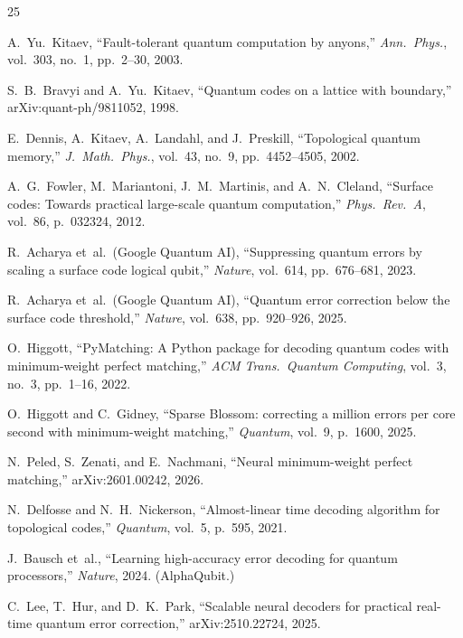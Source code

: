 \documentclass[11pt,a4paper]{article}
\begin{document}
\begin{thebibliography}{25}

A.~Yu.~Kitaev, ``Fault-tolerant quantum computation by anyons,''
\emph{Ann.\ Phys.}, vol.~303, no.~1, pp.~2--30, 2003.

S.~B.~Bravyi and A.~Yu.~Kitaev, ``Quantum codes on a lattice with
boundary,'' arXiv:quant-ph/9811052, 1998.

E.~Dennis, A.~Kitaev, A.~Landahl, and J.~Preskill, ``Topological
quantum memory,'' \emph{J.~Math.\ Phys.}, vol.~43, no.~9,
pp.~4452--4505, 2002.

A.~G.~Fowler, M.~Mariantoni, J.~M.~Martinis, and A.~N.~Cleland,
``Surface codes: Towards practical large-scale quantum computation,''
\emph{Phys.\ Rev.\ A}, vol.~86, p.~032324, 2012.

R.~Acharya et~al.\ (Google Quantum AI), ``Suppressing quantum errors by
scaling a surface code logical qubit,'' \emph{Nature}, vol.~614,
pp.~676--681, 2023.

R.~Acharya et~al.\ (Google Quantum AI), ``Quantum error correction below
the surface code threshold,'' \emph{Nature}, vol.~638, pp.~920--926,
2025.

O.~Higgott, ``PyMatching: A Python package for decoding quantum codes
with minimum-weight perfect matching,'' \emph{ACM Trans.\ Quantum
Computing}, vol.~3, no.~3, pp.~1--16, 2022.

O.~Higgott and C.~Gidney, ``Sparse Blossom: correcting a million errors
per core second with minimum-weight matching,'' \emph{Quantum}, vol.~9,
p.~1600, 2025.

N.~Peled, S.~Zenati, and E.~Nachmani, ``Neural minimum-weight perfect
matching,'' arXiv:2601.00242, 2026.

N.~Delfosse and N.~H.~Nickerson, ``Almost-linear time decoding
algorithm for topological codes,'' \emph{Quantum}, vol.~5, p.~595, 2021.

J.~Bausch et~al., ``Learning high-accuracy error decoding for quantum
processors,'' \emph{Nature}, 2024. (AlphaQubit.)

C.~Lee, T.~Hur, and D.~K.~Park, ``Scalable neural decoders for
practical real-time quantum error correction,'' arXiv:2510.22724, 2025.


\end{thebibliography}
\end{document}
